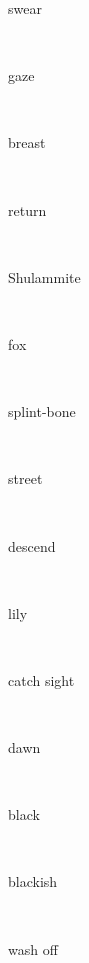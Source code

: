\documentclass[a4paper]{article}
\begin{document}
\begin{multicols}{4}
\begin{multicols}{4}
\begin{multicols}{5}
{\hebrewfont{}} \begin{english}swear\end{english}\\
{\hebrewfont{}} \begin{english}gaze\end{english}\\
{\hebrewfont{}} \begin{english}breast\end{english}\\
{\hebrewfont{}} \begin{english}return\end{english}\\
{\hebrewfont{}} \begin{english}Shulammite\end{english}\\
{\hebrewfont{}} \begin{english}fox\end{english}\\
{\hebrewfont{}} \begin{english}splint-bone\end{english}\\
{\hebrewfont{}} \begin{english}street\end{english}\\
{\hebrewfont{}} \begin{english}descend\end{english}\\
{\hebrewfont{}} \begin{english}lily\end{english}\\
{\hebrewfont{}} \begin{english}catch sight\end{english}\\
{\hebrewfont{}} \begin{english}dawn\end{english}\\
{\hebrewfont{}} \begin{english}black\end{english}\\
{\hebrewfont{}} \begin{english}blackish\end{english}\\
{\hebrewfont{}} \begin{english}wash off\end{english}\\

\end{multicols}
\end{multicols}
\end{multicols}
\end{document}
